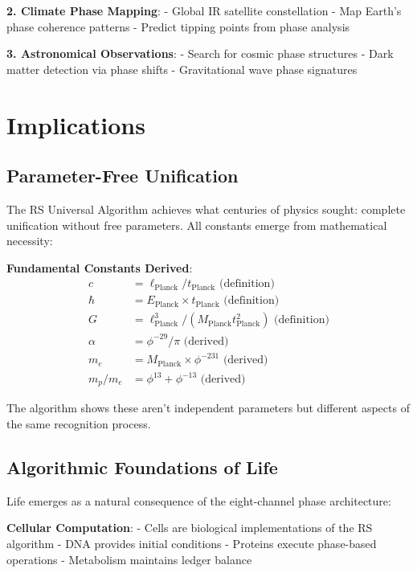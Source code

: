 \documentclass[12pt,a4paper]{article}
\begin{document}
{{\textbf{2. Climate Phase Mapping}:
- Global IR satellite constellation
- Map Earth's phase coherence patterns
- Predict tipping points from phase analysis

\textbf{3. Astronomical Observations}:
- Search for cosmic phase structures
- Dark matter detection via phase shifts
- Gravitational wave phase signatures

\section{Implications}

\subsection{Parameter-Free Unification}

The RS Universal Algorithm achieves what centuries of physics sought: complete unification without free parameters. All constants emerge from mathematical necessity:

\textbf{Fundamental Constants Derived}:
\begin{align}
c &= \ell_{\text{Planck}} / t_{\text{Planck}} \text{ (definition)} \\
\hbar &= E_{\text{Planck}} \times t_{\text{Planck}} \text{ (definition)} \\
G &= \ell_{\text{Planck}}^3 / (M_{\text{Planck}} t_{\text{Planck}}^2) \text{ (definition)} \\
\alpha &= \phi^{-29}/\pi \text{ (derived)} \\
m_e &= M_{\text{Planck}} \times \phi^{-231} \text{ (derived)} \\
m_p/m_e &= \phi^{13} + \phi^{-13} \text{ (derived)}
\end{align}

The algorithm shows these aren't independent parameters but different aspects of the same recognition process.

\subsection{Algorithmic Foundations of Life}

Life emerges as a natural consequence of the eight-channel phase architecture:

\textbf{Cellular Computation}:
- Cells are biological implementations of the RS algorithm
- DNA provides initial conditions
- Proteins execute phase-based operations
- Metabolism maintains ledger balance

}}
\end{document}

